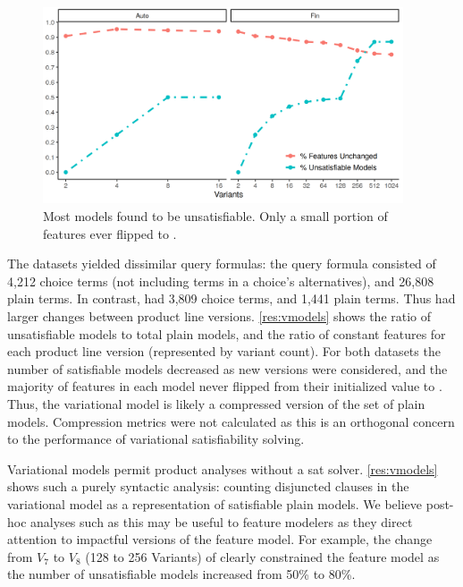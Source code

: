 ~\label{section:case-studies:results-and-discussion}
%
\begin{figure}
  \includegraphics[width=0.95\textwidth]{Plots/VModel}
  \caption{Most models found to be unsatisfiable. Only a small portion of
    features ever flipped to \tru.}%
  \label{res:vmodels}
\end{figure}
%
The datasets yielded dissimilar query formulas: the \auto{} query formula
consisted of 4,212 choice terms (not including terms in a choice's
alternatives), and 26,808 plain terms. In contrast, \fin{} had 3,809 choice
terms, and 1,441 plain terms. Thus \fin{} had larger changes between product
line versions. \autoref{res:vmodels} shows the ratio of unsatisfiable models to
total plain models, and the ratio of constant features for each product line
version (represented by variant count). For both datasets the number of
satisfiable models decreased as new versions were considered, and the majority
of features in each model never flipped from their initialized value \fls{} to
\tru{}. Thus, the variational model is likely a compressed version of the set
of plain models. Compression metrics were not calculated as this is an
orthogonal concern to the performance of variational satisfiability solving.

Variational models permit product analyses without a \ac{sat} solver.
\autoref{res:vmodels} shows such a purely syntactic analysis: counting
disjuncted clauses in the variational model as a representation of satisfiable
plain models. We believe post-hoc analyses such as this may be useful to feature
modelers as they direct attention to impactful versions of the feature model.
For example, the change from $V_{7}$ to $V_{8}$ (128 to 256 Variants) of \fin{}
clearly constrained the feature model as the number of unsatisfiable models
increased from 50\% to 80\%.



